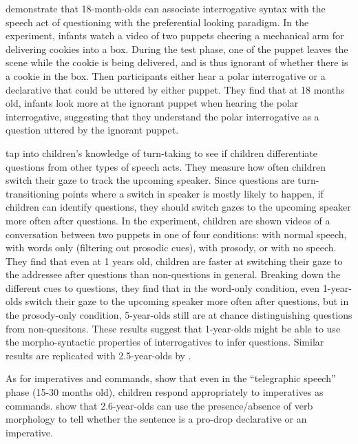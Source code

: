 \textcite{marshmallowqueen} demonstrate that 18-month-olds can associate interrogative syntax with the speech act of questioning with the preferential looking paradigm. In the experiment, infants watch a video of two puppets cheering a mechanical arm for delivering cookies into a box. During the test phase, one of the puppet leaves the scene while the cookie is being delivered, and is thus ignorant of whether there is a cookie in the box. Then participants either hear a polar interrogative  or a declarative  that could be uttered by either puppet. They find that at 18 months old, infants look more at the ignorant puppet when hearing the polar interrogative, suggesting that they understand the polar interrogative as a question uttered by the ignorant puppet.

\textcite{casillas2017turn} tap into children's knowledge of turn-taking to see if children differentiate questions from other types of speech acts. They measure how often children switch their gaze to track the upcoming speaker. Since questions are turn-transitioning points where a switch in speaker is mostly likely to happen, if children can identify questions, they should switch gazes to the upcoming speaker more often after questions. In the experiment, children are shown videos of a conversation between two puppets in one of four conditions: with normal speech, with words only (filtering out prosodic cues), with prosody, or with no speech. They find that even at 1 years old, children are faster at switching their gaze to the addressee after questions than non-questions in general. Breaking down the different cues to questions, they find that in the word-only condition, even 1-year-olds switch their gaze to the upcoming speaker more often after questions, but in the prosody-only condition, 5-year-olds still are at chance distinguishing questions from non-quesitons. These results suggest that 1-year-olds might be able to use the morpho-syntactic properties of interrogatives to infer questions. Similar results are replicated with 2.5-year-olds by \textcite{lammertink2015turn}.


As for imperatives and commands, \textcite{} show that even in the ``telegraphic speech'' phase (15-30 months old), children respond appropriately to imperatives as commands. \textcite{orfitellihyams2012subj} show that 2.6-year-olds can use the presence/absence of verb morphology to tell whether the sentence is a pro-drop declarative or an imperative. 

